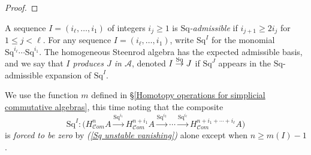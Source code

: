 \documentclass[11pt]{amsart} \renewcommand{\baselinestretch}{1.4}
\theoremstyle{plain}
\theoremstyle{definition}
\renewcommand{\to}{\longrightarrow}
\newcommand{\scrC}{\mathscr{C}}
\newcommand{\calA}{\mathcal{A}}
\newcommand{\minDimDelta}{m}
\newcommand{\produces}[3]{#3:#1\sim #2}
\renewcommand{\produces}[3]{#1\rightarrow_{#3} #2}%
\renewcommand{\produces}[3]{#1\overset{\smash{#3}}{\rightarrow} #2}%
\newcommand{\Sq}{\mathrm{Sq}}
\newcommand{\LieSteen}{\calA}
\newcommand{\algs}{{\scrC\!\textit{om}}}
\begin{document}
\begin{Constructing cohomology operations}
\begin{proof}
\end{proof}
A sequence $I=(i_\ell,\ldots,i_1)$ of integers $i_j\geq1$ is \emph{$\Sq$-admissible} if $i_{j+1}\geq 2i_j$ for $1\leq j <\ell$. For any sequence $I=(i_\ell,\ldots,i_1)$, write $\Sq^I$ for the monomial $\Sq^{i_\ell}\cdots \Sq^{i_1}$. The homogeneous Steenrod algebra has the expected admissible basis, and we say that \emph{$I$ produces $J$ in $\LieSteen$}, denoted $\produces{I}{J}{\Sq}$ if $\Sq^J$ appears in the $\Sq$-admissible expansion of $\Sq^I$.

We use the function $\minDimDelta$ defined in \S\ref{Homotopy operations for simplicial commutative algebras}, this time  noting that the composite 
\[\Sq^I:\bigl(H_{\algs}^{n}A\overset{\Sq^{i_1}}{\to}H_{\algs}^{n+i_1}A\overset{\Sq^{i_2}}{\to}\cdots \overset{\Sq^{i_\ell}}{\to}H_{\algs}^{n+i_1+\cdots +i_\ell}A\bigr)\]
is \emph{forced to be zero} by \emph{(\ref{Sq unstable vanishing})} alone except  when $n\geq\minDimDelta(I)-1$.



\end{Constructing cohomology operations}
\end{document}
